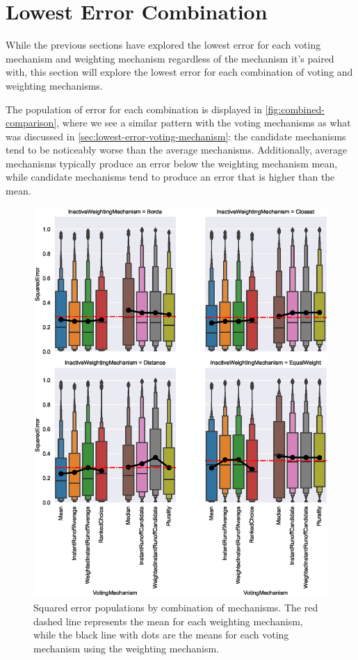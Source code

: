 \section{Lowest Error Combination}\label{sec:lowest-error-overall-combination}
While the previous sections have explored the lowest error for each voting mechanism and
weighting mechanism regardless of the mechanism it's paired with, this section will
explore the lowest error for each combination of voting and weighting mechanisms.

The population of error for each combination is displayed in
\autoref{fig:combined-comparison}, where we see a similar pattern with the voting
mechanisms as what was discussed in \autoref{sec:lowest-error-voting-mechanism}: the
candidate mechanisms tend to be noticeably worse than the average mechanisms.
Additionally, average mechanisms typically produce an error below the weighting
mechanism mean, while candidate mechanisms tend to produce an error that is higher
than the mean.

\begin{figure}[htbp]
    \centering
    \includegraphics[scale=0.75]
    {./content/figures/combinations/combined_comparison}
    \caption{Squared error populations by combination of mechanisms. The red dashed
    line represents the mean for each weighting mechanism, while the black line with
    dots are the means for each voting mechanism using the weighting mechanism.}
    \label{fig:combined-comparison}
\end{figure}

